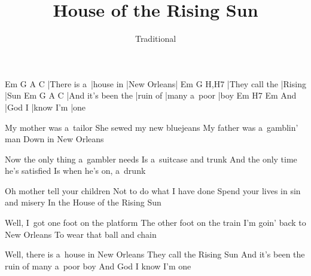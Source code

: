 \documentclass{song}
\title{House of the Rising Sun}
\author{Traditional}
\begin{document}
\strophe
Em          G         A           C
|There is a~|house in |New Orleans|
Em             G       H,H7
|They call the |Rising |Sun
Em                 G        A            C
|And it's been the |ruin of |many a~poor |boy
    Em     H7        Em
And |God I |know I'm |one
\endstrophe

\strophe*
My mother was a~tailor
She sewed my new bluejeans
My father was a~gamblin' man
Down in New Orleans
\endstrophe

\strophe*
Now the only thing a~gambler needs
Is a~suitcase and trunk
And the only time he's satisfied
Is when he's on, a~drunk
\endstrophe

\strophe*
Oh mother tell your children
Not to do what I have done
Spend your lives in sin and misery
In the House of the Rising Sun
\endstrophe

\strophe*
Well, I~got one foot on the platform
The other foot on the train
I'm goin' back to New Orleans
To wear that ball and chain
\endstrophe

\strophe*
Well, there is a~house in New Orleans
They call the Rising Sun
And it's been the ruin of many a~poor boy
And God I know I'm one
\endstrophe
\end{document}
